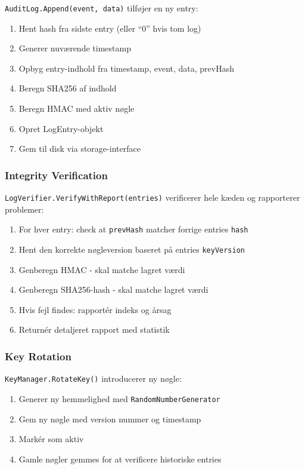\documentclass[12pt, a4paper, danish]{article}
\begin{document}
\texttt{AuditLog.Append(event, data)} tilføjer en ny entry:
\begin{enumerate}
    \item Hent hash fra sidste entry (eller ``0'' hvis tom log)
    \item Generer nuværende timestamp
    \item Opbyg entry-indhold fra timestamp, event, data, prevHash
    \item Beregn SHA256 af indhold
    \item Beregn HMAC med aktiv nøgle
    \item Opret LogEntry-objekt
    \item Gem til disk via storage-interface
\end{enumerate}

\subsubsection{Integrity Verification}

\texttt{LogVerifier.VerifyWithReport(entries)} verificerer hele kæden og rapporterer problemer:
\begin{enumerate}
    \item For hver entry: check at \texttt{prevHash} matcher forrige entries \texttt{hash}
    \item Hent den korrekte nøgleversion baseret på entries \texttt{keyVersion}
    \item Genberegn HMAC - skal matche lagret værdi
    \item Genberegn SHA256-hash - skal matche lagret værdi
    \item Hvis fejl findes: rapportér indeks og årsag
    \item Returnér detaljeret rapport med statistik
\end{enumerate}

\subsubsection{Key Rotation}

\texttt{KeyManager.RotateKey()} introducerer ny nøgle:
\begin{enumerate}
    \item Generer ny hemmelighed med \texttt{RandomNumberGenerator}
    \item Gem ny nøgle med version nummer og timestamp
    \item Markér som aktiv
    \item Gamle nøgler gemmes for at verificere historiske entries
\end{enumerate}
\end{document}
